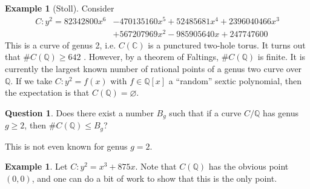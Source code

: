 \documentclass{article}
\theoremstyle{definition}
\newtheorem{example}[subsection]{Example}
\newtheorem{question}[subsection]{Question}
\begin{document}
\begin{example}[Stoll]
Consider 
\begin{align*}
  C : y^2 = 82342800 x^6 &- 470135160 x^5 + 52485681 x^4 + 2396040466 x^3 \\
    &+ 567207969 x^2 - 985905640 x + 247747600
\end{align*}
This is a curve of genus 2, i.e. $C(\mathbb{C})$ is a punctured two-hole 
torus. It turns out that $\# C(\mathbb{Q})\geqslant 642$ \cite[\S 6]{st09}. 
However, by a theorem of Faltings, $\# C(\mathbb{Q})$ is finite. It is 
currently the largest known number of rational points of a genus two curve 
over $\mathbb{Q}$. If we take $C:y^2=f(x)$ with $f\in\mathbb{Q}[x]$ a 
``random'' sextic polynomial, then the expectation is that 
$C(\mathbb{Q})=\varnothing$. 
\end{example}

\begin{question}
Does there exist a number $B_g$ such that if a curve $C/\mathbb{Q}$ has 
genus $g\geqslant 2$, then $\# C(\mathbb{Q})\leqslant B_g$?
\end{question}

This is not even known for genus $g=2$. 

\begin{example}
Let $C:y^2=x^3+875 x$. Note that $C(\mathbb{Q})$ has the obvious point 
$(0,0)$, and one can do a bit of work to show that this is the only point. 
\end{example}
\end{document}
